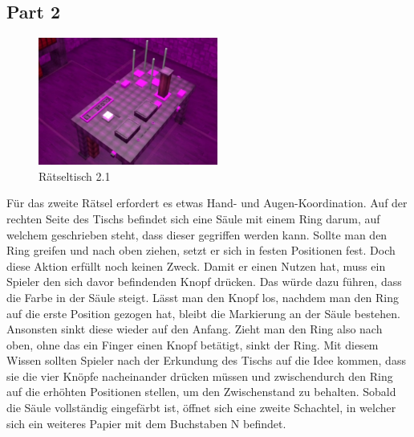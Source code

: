 \subsection{Part 2}
\begin{figure}
	\vspace*{-1cm}
	\includegraphics[width=5.9cm]{Pictures/Tisch2}
	\caption{Rätseltisch 2.1}
	\vspace*{0cm}
	\label{fig:tisch2}
\end{figure}
Für das zweite Rätsel erfordert es etwas Hand- und Augen-Koordination. Auf der rechten Seite des Tischs befindet sich eine Säule mit einem Ring darum, auf welchem geschrieben steht, dass dieser gegriffen werden kann. Sollte man den Ring greifen und nach oben ziehen, setzt er sich in festen Positionen fest. Doch diese Aktion erfüllt noch keinen Zweck. Damit er einen Nutzen hat, muss ein Spieler den sich davor befindenden Knopf drücken. Das würde dazu führen, dass die Farbe in der Säule steigt. Lässt man den Knopf los, nachdem man den Ring auf die erste Position gezogen hat, bleibt die Markierung an der Säule bestehen. Ansonsten sinkt diese wieder auf den Anfang. Zieht man den Ring also nach oben, ohne das ein Finger einen Knopf betätigt, sinkt der Ring. Mit diesem Wissen sollten Spieler nach der Erkundung des Tischs auf die Idee kommen, dass sie die vier Knöpfe nacheinander drücken müssen und zwischendurch den Ring auf die erhöhten Positionen stellen, um den Zwischenstand zu behalten. Sobald die Säule vollständig eingefärbt ist, öffnet sich eine zweite Schachtel, in welcher sich ein weiteres Papier mit dem Buchstaben N befindet.
